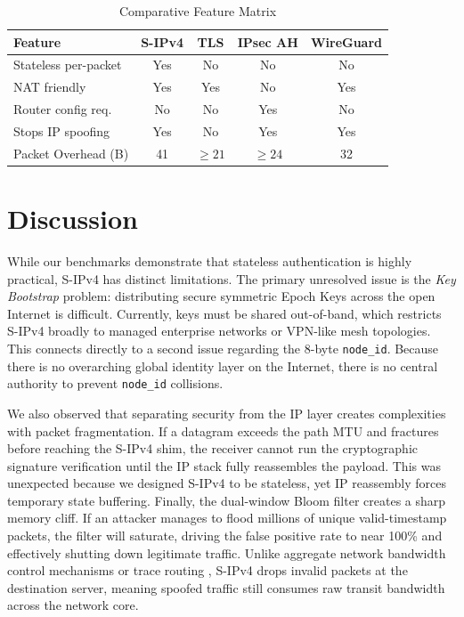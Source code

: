 \documentclass[journal]{IEEEtran}
\begin{document}
\begin{table}[!ht]
\centering
\caption{Comparative Feature Matrix}
\label{tab:features}
\begin{tabular}{@{}lcccc@{}}
\toprule
\textbf{Feature} & \textbf{S-IPv4} & \textbf{TLS} & \textbf{IPsec AH} & \textbf{WireGuard} \\ \midrule
Stateless per-packet  & Yes   & No   & No  & No  \\
NAT friendly          & Yes   & Yes  & No  & Yes \\
Router config req.    & No    & No   & Yes & No  \\
Stops IP spoofing     & Yes   & No   & Yes & Yes \\
Packet Overhead (B)   & 41    & $\ge 21$ & $\ge 24$ & 32  \\ \bottomrule
\end{tabular}
\end{table}

\section{Discussion}
\label{sec:discussion}
While our benchmarks demonstrate that stateless authentication is highly practical, S-IPv4 has distinct limitations. The primary unresolved issue is the \textit{Key Bootstrap} problem: distributing secure symmetric Epoch Keys across the open Internet is difficult. Currently, keys must be shared out-of-band, which restricts S-IPv4 broadly to managed enterprise networks or VPN-like mesh topologies. This connects directly to a second issue regarding the 8-byte \texttt{node\_id}. Because there is no overarching global identity layer on the Internet, there is no central authority to prevent \texttt{node\_id} collisions.

We also observed that separating security from the IP layer creates complexities with packet fragmentation. If a datagram exceeds the path MTU and fractures before reaching the S-IPv4 shim, the receiver cannot run the cryptographic signature verification until the IP stack fully reassembles the payload. This was unexpected because we designed S-IPv4 to be stateless, yet IP reassembly forces temporary state buffering. Finally, the dual-window Bloom filter creates a sharp memory cliff. If an attacker manages to flood millions of unique valid-timestamp packets, the filter will saturate, driving the false positive rate to near 100\% and effectively shutting down legitimate traffic. Unlike aggregate network bandwidth control mechanisms \cite{mahajan2002controlling} or trace routing \cite{burch2000tracing}, S-IPv4 drops invalid packets at the destination server, meaning spoofed traffic still consumes raw transit bandwidth across the network core.
\end{document}
